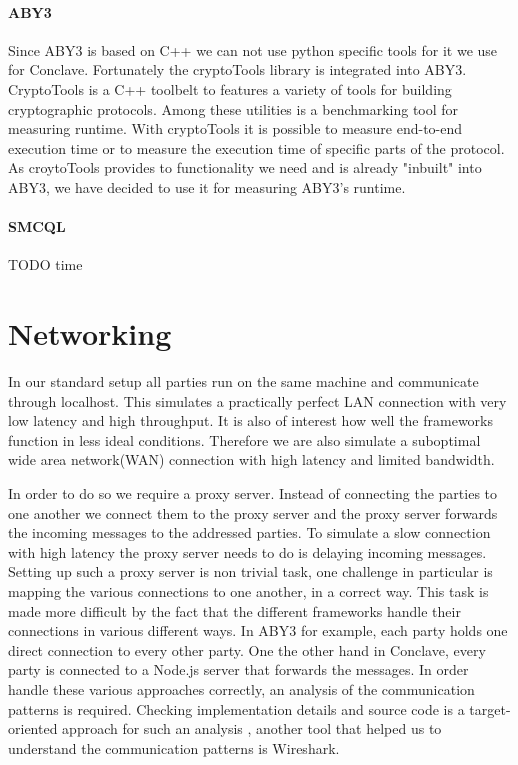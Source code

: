 \paragraph{ABY3}
Since ABY3 is based on C++ we can not use python specific tools for it we use for Conclave. Fortunately the cryptoTools library \cite{cryotoTools} is integrated into ABY3. CryptoTools is a C++ toolbelt to features a variety of tools for building cryptographic protocols. Among these utilities is a benchmarking tool for measuring runtime. With cryptoTools it is possible to measure end-to-end execution time or to measure the execution time of specific parts of the protocol. As croytoTools provides to functionality we need and is already "inbuilt" into ABY3, we have decided to use it for measuring ABY3's runtime.
\paragraph{SMCQL}
TODO time \cite{time_sh}
 
\section{Networking}
In our standard setup all parties run on the same machine and communicate through localhost. This simulates a practically perfect LAN connection with very low latency and high throughput. It is also of interest how well the frameworks function in less ideal conditions. Therefore we are also simulate a suboptimal wide area network(WAN) connection with high latency and limited bandwidth.

In order to do so we require a proxy server. Instead of connecting the parties to one another we connect them to the proxy server and the proxy server forwards the incoming messages to the addressed parties. To simulate a slow connection with high latency the proxy server needs to do is delaying incoming messages. Setting up such a proxy server is non trivial task, one challenge in particular is mapping the various connections to one another, in a correct way. This task is made more difficult by the fact that the different frameworks handle their connections in various different ways. In ABY3 for example, each party holds one direct connection to every other party. One the other hand in Conclave, every party is connected to a Node.js server that forwards the messages. In order handle these various approaches correctly, an analysis of the communication patterns is required. Checking implementation details and source code is a target-oriented approach for such an analysis , another tool that helped us to understand the communication patterns is Wireshark.      

